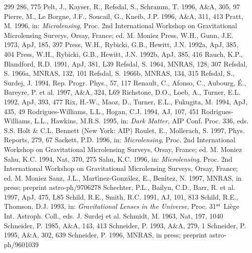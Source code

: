 \documentclass[a4paper,10pt]{article} %
\begin{document}
\begin{thebibliography}{299}
  286, 775
  Pelt, J., Kayser, R., Refsdal, S., Schramm, T. 1996, A\&A, 305, 97
  Pierre, M., Le Borgne, J.F., Soucail, G., Kneib, J.P. 1996, A\&A,
  311, 413
  Pratt, M. 1996, in: {\em Microlensing\/}, Proc. 2nd International
  Workshop on Gravitational Microlensing Surveys, Orsay, France;
  ed. M. Moniez
  Press, W.H., Gunn, J.E. 1973, ApJ, 185, 397
  Press, W.H., Rybicki, G.B., Hewitt, J.N. 1992a, ApJ, 385, 404
  Press, W.H., Rybicki, G.B., Hewitt, J.N. 1992b, ApJ, 385, 416
  Rauch, K.P., Blandford, R.D. 1991, ApJ, 381, L39
  Refsdal, S. 1964, MNRAS, 128, 307
  Refsdal, S. 1966a, MNRAS, 132, 101
  Refsdal, S. 1966b, MNRAS, 134, 315
  Refsdal, S., Surdej, J. 1994, Rep. Progr. Phys., 57, 117
  Renault, C., Afonso, C., Aubourg, \'E., Bareyre, P. et al. 1997,
  A\&A, 324, L69
  Richstone, D.O., Loeb, A., Turner, E.L. 1992, ApJ, 393, 477
  Rix, H.-W., Maoz, D., Turner, E.L., Fukugita, M. 1994, ApJ, 435, 49
  Rodrigues-Williams, L.L., Hogan, C.J. 1994, AJ, 107, 451
  Rodrigues-Williams, L.L., Hawkins, M.R.S. 1995, in: {\em Dark
  Matter\/}, AIP Conf. Proc. 336, eds. S.S. Holt \& C.L. Bennett (New
  York: AIP)
  Roulet, E., Mollerach, S. 1997, Phys. Reports, 279, 67
  Sackett, P.D. 1996, in: {\em Microlensing\/}, Proc. 2nd
  International Workshop on Gravitational Microlensing Surveys, Orsay,
  France; ed. M. Moniez
  Sahu, K.C. 1994, Nat, 370, 275
  Sahu, K.C. 1996, in: {\em Microlensing\/}, Proc. 2nd International
  Workshop on Gravitational Microlensing Surveys, Orsay, France;
  ed. M. Moniez
  Sanz, J.L., Mart{\'\i}nez-Gonz\'alez, E., Ben{\'\i}tez, N. 1997,
  MNRAS, in press; preprint astro-ph/9706278
  Schechter, P.L., Bailyn, C.D., Barr, R. et al. 1997, ApJ, 475, L85
  Schild, R.E., Smith, R.C. 1991, AJ, 101, 813
  Schild, R.E., Thomson, D.J. 1993, in: {\em Gravitational Lenses in
  the Universe\/}, Proc. 31$^{\rm st}$ Li\`ege Int. Astroph. Coll.,
  eds. J. Surdej et al.
  Schmidt, M. 1963, Nat, 197, 1040
  Schneider, P. 1985, A\&A, 143, 413
  Schneider, P. 1993, A\&A, 279, 1
  Schneider, P. 1995, A\&A, 302, 639
  Schneider, P. 1996, MNRAS, in press; preprint astro-ph/9601039

\end{thebibliography}
\end{document}
